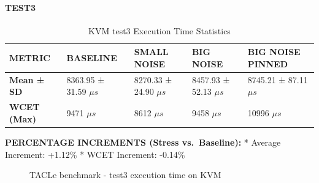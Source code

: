 \paragraph{TEST3}\label{test3}

\begin{table}
\centering
\caption{KVM test3 Execution Time Statistics}
\label{tab:kvm:test3}
\begin{tabularx}{\linewidth}{@{}YYYYY@{}}
\toprule
METRIC & BASELINE & SMALL NOISE & BIG NOISE & BIG NOISE PINNED\tabularnewline
\midrule
\textbf{Mean ± SD} & 8363.95 ± 31.59 $\mu s$ & 8270.33 ± 24.90 $\mu s$ & 8457.93 ± 52.13 $\mu s$ & 8745.21 ± 87.11 $\mu s$\tabularnewline
\textbf{WCET (Max)} & 9471 $\mu s$ & 8612 $\mu s$ & 9458 $\mu s$ & 10996 $\mu s$\tabularnewline
\bottomrule
\end{tabularx}
\end{table}

\textbf{PERCENTAGE INCREMENTS (Stress vs.~Baseline):} * Average
Increment: +1.12\% * WCET Increment: -0.14\%

\begin{figure}
\centering

\caption{TACLe benchmark - test3 execution time on KVM}
\end{figure}
